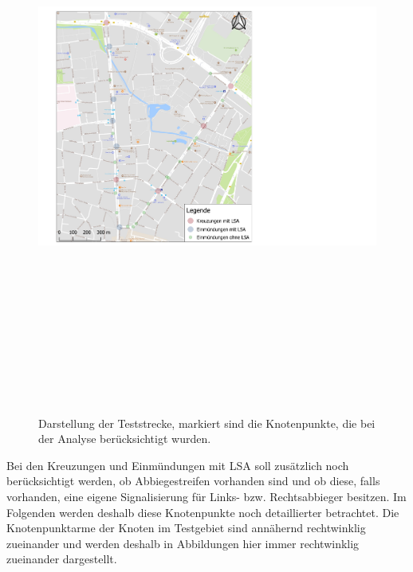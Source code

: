 \begin{savenotes}
	\begin{figure}[H]
		\centering
		\includegraphics[width=24cm,height=19cm]{figures/Markante_Punkte}
		\caption[Darstellung der Teststrecke, markiert sind die Knotenpunkte, die bei der Analyse berücksichtigt wurden]{Darstellung der Teststrecke, markiert sind die Knotenpunkte, die bei der Analyse berücksichtigt wurden.}\label{fig:Knoten_Testgebiet}
	\end{figure}
\end{savenotes}


Bei den Kreuzungen und Einmündungen mit LSA soll zusätzlich noch berücksichtigt werden, ob Abbiegestreifen vorhanden sind und ob diese, falls vorhanden, eine eigene Signalisierung für Links- bzw. Rechtsabbieger besitzen. Im Folgenden werden deshalb diese Knotenpunkte noch detaillierter betrachtet. Die Knotenpunktarme der Knoten im Testgebiet sind annähernd rechtwinklig zueinander und werden deshalb in Abbildungen hier immer rechtwinklig zueinander dargestellt.

